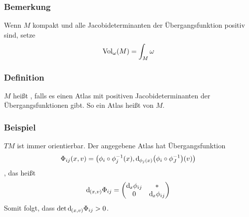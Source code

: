 \subsubsection[Bemerkung: Volumen von kompakten Mannigfaltigkeiten]{Bemerkung}
\label{ssub:1100}
Wenn $M$ kompakt und alle Jacobideterminanten der Übergangsfunktion positiv sind, setze 
\[
\operatorname{Vol}_\omega (M) = \int_M \omega
\]

\subsubsection{Definition}
\label{ssub:1101}
$M$ heißt , falls es einen Atlas mit positiven Jacobideterminanten der Übergangsfunktionen gibt. So ein Atlas heißt  von $M$.

\subsubsection{Beispiel}
\label{ssub:1102}
$TM$ ist immer orientierbar. Der angegebene Atlas hat Übergangsfunktion 
\[
\Phi_{ij} (x,v) = \enbrace*{\phi_i \circ \phi_j^{-1} (x), \mathd _{\phi_j(x)}\enbrace*{\phi_i \circ \phi_J^{-1}}(v)}
\]
, das heißt
\[
\mathrm{d}\mkern-1.0mu_{(x,v)} \Phi_{ij} = \begin{pmatrix}
\mathrm{d}\mkern-1.0mu_x \phi_{ij} & *\\
0 & \mathrm{d}\mkern-1.0mu_x \phi_{ij}
\end{pmatrix}
\]
Somit folgt, dass $\det \mathrm{d}\mkern-1.0mu_{(x,v)} \Phi_{ij} > 0$.

